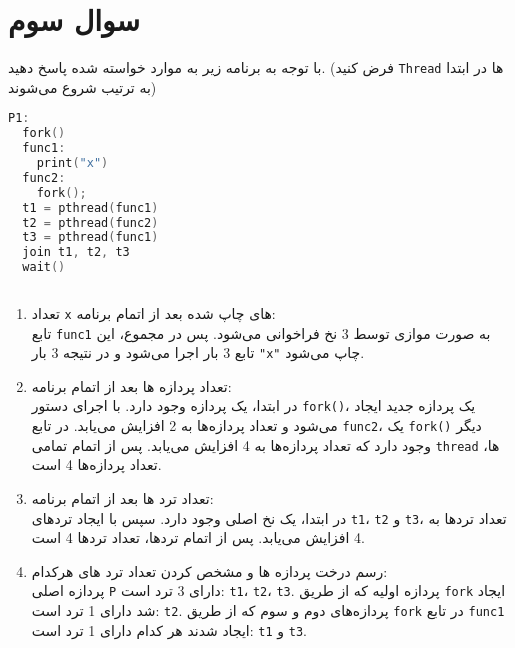 \section{سوال سوم}
با توجه به برنامه زیر به موارد خواسته شده پاسخ دهید. (فرض کنید  \texttt{Thread} ها در ابتدا به ترتیب شروع می‌شوند)

\begin{latin}
\begin{lstlisting}[label=first,caption=Some Code, language=C]
P1:
  fork()
  func1:
    print("x")
  func2:
    fork();
  t1 = ‫‪pthread‬‬(func1)
  t2 = ‫‪pthread‬‬(func2)
  t3 = ‫‪pthread‬‬(func1)
  join t1, t2, t3
  wait()
	
\end{lstlisting}
\end{latin}


\begin{qsolve}
	\begin{enumerate}
		\item ‫تعداد‬ \texttt{‫‪x}‬‬ ‫های‬ ‫چاپ‬ ‫شده‬ ‫بعد‬ ‫از‬ ‫اتمام‬ ‫برنامه‬: \\
		تابع \texttt{func1} به صورت موازی توسط 3 نخ فراخوانی می‌شود. پس در مجموع، این تابع 3 بار اجرا می‌شود و در نتیجه 3 بار \texttt{"x"} چاپ می‌شود.
		
		
		
		\item ‫تعداد‬ ‫پردازه‬ ‫ها‬ ‫بعد‬ ‫از‬ ‫اتمام‬ ‫برنامه‬: \\
		در ابتدا، یک پردازه وجود دارد. با اجرای دستور \texttt{fork()}، یک پردازه جدید ایجاد می‌شود و تعداد پردازه‌ها به 2 افزایش می‌یابد. در تابع \texttt{func2}، یک \texttt{fork()} دیگر وجود دارد که تعداد پردازه‌ها به 4 افزایش می‌یابد. پس از اتمام تمامی \texttt{thread} ها، تعداد پردازه‌ها 4 است.
		
		
		
		
		\item ‫تعداد‬ ‫ترد‬ ‫ها‬ ‫بعد‬ ‫از‬ ‫اتمام‬ ‫برنامه‬: \\
		در ابتدا، یک نخ اصلی وجود دارد.
		سپس با ایجاد تردهای \texttt{t1}، \texttt{t2} و \texttt{t3}، تعداد تردها به 4 افزایش می‌یابد.
		پس از اتمام تردها، تعداد تردها 4 است.
		
		
		\item ‫رسم‬ ‫درخت‬ ‫پردازه‬ ‫ها‬ ‫و‬ ‫مشخص‬ ‫کردن‬ ‫تعداد‬ ‫ترد‬ ‫های‬ ‫هرکدام‬: \\
پردازه اصلی \texttt{P} دارای 3 ترد است: \texttt{t1}، \texttt{t2}، \texttt{t3}.
پردازه اولیه که از طریق \texttt{fork} ایجاد شد دارای 1 ترد است: \texttt{t2}.
پردازه‌های دوم و سوم که از طریق \texttt{fork} در تابع \texttt{func1} ایجاد شدند هر کدام دارای 1 ترد است: \texttt{t1} و \texttt{t3}.
		

\end{enumerate}
\end{qsolve}
